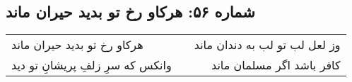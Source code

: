 \begin{center}
\section*{شماره ۵۶: هرکاو رخ تو بدید حیران ماند}
\label{sec:056}
\begin{longtable}{l p{0.5cm} r}
هرکاو رخ تو بدید حیران ماند
&&
وز لعل لب تو لب به دندان ماند
\\
وانکس که سرِ زلفِ پریشانِ تو دید
&&
کافر باشد اگر مسلمان ماند
\\
\end{longtable}
\end{center}
